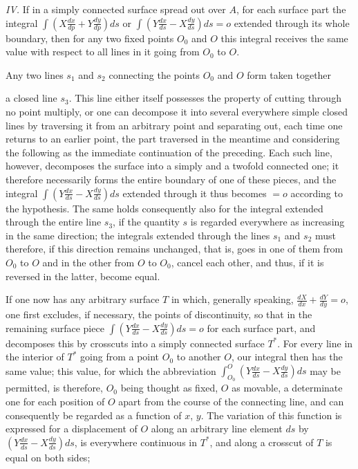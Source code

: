 \documentclass{article}
\begin{document}
\emph{IV.} If in a simply connected surface spread out over $A$, for each surface part the integral $\displaystyle\int \left(X\frac{dx}{dp} + Y\frac{dy}{dp}\right) ds$ or $\displaystyle\int \left(Y\frac{dx}{ds} - X\frac{dy}{ds}\right) ds = o$ extended through its whole boundary, then for any two fixed points $O_0$ and $O$ this integral receives the same value with respect to all lines in it going from $O_0$ to $O$.

Any two lines $s_1$ and $s_2$ connecting the points $O_0$ and $O$ form taken together

a closed line $s_3$. This line either itself possesses the property of cutting through no point multiply, or one can decompose it into several everywhere simple closed lines by traversing it from an arbitrary point and separating out, each time one returns to an earlier point, the part traversed in the meantime and considering the following as the immediate continuation of the preceding. Each such line, however, decomposes the surface into a simply and a twofold connected one; it therefore necessarily forms the entire boundary of one of these pieces, and the integral $\displaystyle\int \left(Y\frac{dx}{ds} - X\frac{dy}{ds}\right) ds$ extended through it thus becomes $= o$ according to the hypothesis. The same holds consequently also for the integral extended through the entire line $s_3$, if the quantity $s$ is regarded everywhere as increasing in the same direction; the integrals extended through the lines $s_1$ and $s_2$ must therefore, if this direction remains unchanged, that is, goes in one of them from $O_0$ to $O$ and in the other from $O$ to $O_0$, cancel each other, and thus, if it is reversed in the latter, become equal.

If one now has any arbitrary surface $T$ in which, generally speaking, $\frac{dX}{dx} + \frac{dY}{dy} = o$, one first excludes, if necessary, the points of discontinuity, so that in the remaining surface piece $\displaystyle\int \left(Y\frac{dx}{ds} - X\frac{dy}{ds}\right) ds = o$ for each surface part, and decomposes this by crosscuts into a simply connected surface $T^*$. For every line in the interior of $T^*$ going from a point $O_0$ to another $O$, our integral then has the same value; this value, for which the abbreviation $\displaystyle\int_{O_0}^O \left(Y\frac{dx}{ds} - X\frac{dy}{ds}\right) ds$ may be permitted, is therefore, $O_0$ being thought as fixed, $O$ as movable, a determinate one for each position of $O$ apart from the course of the connecting line, and can consequently be regarded as a function of $x$, $y$. The variation of this function is expressed for a displacement of $O$ along an arbitrary line element $ds$ by $\left(Y\frac{dx}{ds} - X\frac{dy}{ds}\right) ds$, is everywhere continuous in $T^*$, and along a crosscut of $T$ is equal on both sides;
\end{document}
